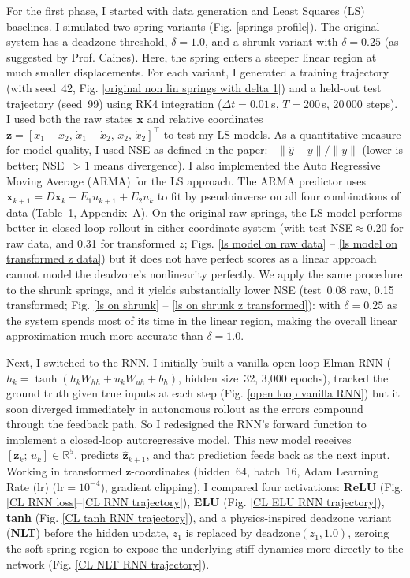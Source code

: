 \documentclass[12pt]{article}
\begin{document}
For the first phase, I started with data generation and Least Squares (LS) baselines. I simulated two spring variants (Fig. \ref{springs profile}). The original system has a deadzone threshold, $\delta{=}1.0$, and a shrunk variant with $\delta{=}0.25$ (as suggested by Prof. Caines). Here, the spring enters a steeper linear region at much smaller displacements. For each variant, I generated a training trajectory (with seed~42, Fig. \ref{original non lin springs with delta 1}) and a held-out test trajectory
(seed~99) using RK4 integration ($\Delta t{=}0.01$\,s, $T{=}200$\,s, 20\,000 steps).
I used both the raw states $\mathbf{x}$ and relative coordinates
$\mathbf{z}=[x_1{-}x_2,\,\dot{x}_1{-}\dot{x}_2,\,x_2,\,\dot{x}_2]^{\top}$ to test my LS models. As a quantitative measure for model quality, I used NSE as defined in the paper: ~$\|\hat{y}{-}y\|/\|y\|$ (lower is better;
NSE~$>1$ means divergence). I also implemented the Auto Regressive Moving Average (ARMA) for the LS approach. The ARMA predictor uses $\mathbf{x}_{k+1}=D\mathbf{x}_k+E_1 u_{k+1}+E_2 u_k$
to fit by pseudoinverse on all four combinations of data (Table~1, Appendix~A).
On the original raw springs, the LS model performs better in closed-loop rollout in either coordinate system (with test NSE$\approx$0.20 for raw data, and 0.31 for transformed $z$; Figs. \ref{ls model on raw data} -- \ref{ls model on transformed z data}) but it does not have perfect scores as a linear approach cannot model the deadzone's nonlinearity perfectly. We apply the same procedure to the shrunk springs, and it yields substantially lower NSE (test~0.08 raw, 0.15 transformed; Fig. \ref{ls on shrunk} -- \ref{ls on shrunk z transformed}): with $\delta{=}0.25$ as the system spends most of its time in the linear region, making the overall linear approximation much more accurate than $\delta {=} 1.0$.

Next, I switched to the RNN. I initially built a vanilla open-loop Elman RNN ($h_k=\tanh(h_k W_{hh}+u_k W_{uh}+b_h)$,
hidden size~32, 3,000 epochs), tracked the ground truth given true inputs at each step
(Fig. \ref{open loop vanilla RNN}) but it soon diverged immediately in autonomous rollout as the errors compound through the feedback path. So I redesigned the RNN's forward function to implement a closed-loop autoregressive model. This new model receives $[\mathbf{z}_k;\,u_k]\in\mathbb{R}^5$, predicts
$\hat{\mathbf{z}}_{k+1}$, and that prediction feeds back as the next input.
Working in transformed $\mathbf{z}$-coordinates (hidden~64, batch~16, Adam
Learning Rate (lr) ($\text{lr}{=}10^{-4}$), gradient clipping), I compared four activations:
\textbf{ReLU} (Fig. \ref{CL RNN loss}--\ref{CL RNN trajectory}), \textbf{ELU} (Fig. \ref{CL ELU RNN trajectory}), \textbf{tanh} (Fig. \ref{CL tanh RNN trajectory}), and a
physics-inspired deadzone variant (\textbf{NLT}) before the hidden update,
$z_1$ is replaced by $\text{deadzone}(z_1,1.0)$, zeroing the soft spring region to
expose the underlying stiff dynamics more directly to the network (Fig. \ref{CL NLT RNN trajectory}).
\end{document}
